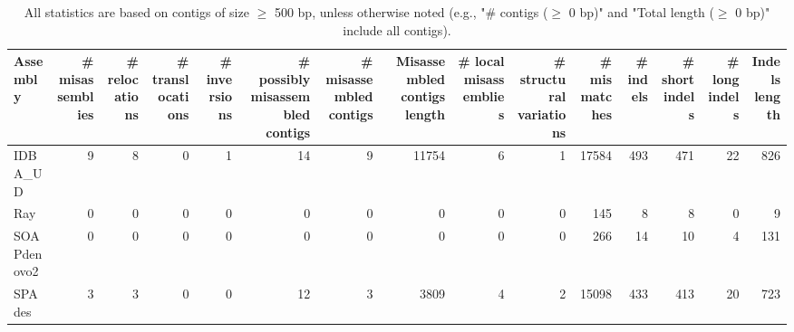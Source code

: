 \documentclass[12pt,a4paper]{article}
\begin{document}
\begin{table}[ht]
\begin{center}
\caption{All statistics are based on contigs of size $\geq$ 500 bp, unless otherwise noted (e.g., "\# contigs ($\geq$ 0 bp)" and "Total length ($\geq$ 0 bp)" include all contigs).}
\begin{tabular}{|l*{14}{|r}|}
\hline
Assembly & \# misassemblies &     \# relocations &     \# translocations &     \# inversions & \# possibly misassembled contigs & \# misassembled contigs & Misassembled contigs length & \# local misassemblies & \# structural variations & \# mismatches & \# indels &     \# short indels &     \# long indels & Indels length \\ \hline
IDBA\_UD & 9 & 8 & 0 & 1 & 14 & 9 & 11754 & 6 & 1 & 17584 & 493 & 471 & 22 & 826 \\ \hline
Ray & 0 & 0 & 0 & 0 & 0 & 0 & 0 & 0 & 0 & 145 & 8 & 8 & 0 & 9 \\ \hline
SOAPdenovo2 & 0 & 0 & 0 & 0 & 0 & 0 & 0 & 0 & 0 & 266 & 14 & 10 & 4 & 131 \\ \hline
SPAdes & 3 & 3 & 0 & 0 & 12 & 3 & 3809 & 4 & 2 & 15098 & 433 & 413 & 20 & 723 \\ \hline
\end{tabular}
\end{center}
\end{table}
\end{document}
